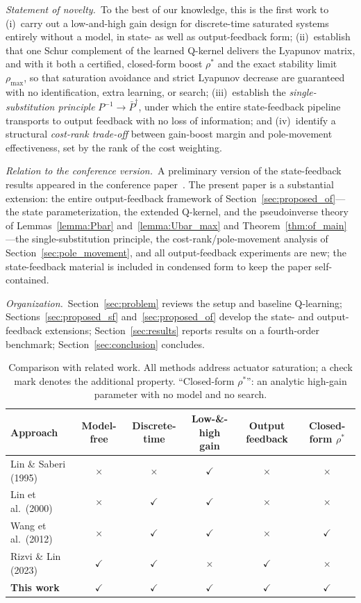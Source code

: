 \documentclass[final,5p,times,authoryear]{elsarticle}
\theoremstyle{plain}
\theoremstyle{definition}
\theoremstyle{remark}
\begin{document}
\emph{Statement of novelty.}\ To the best of our knowledge, this is
the first work to (i)~carry out a low-and-high gain design for
discrete-time saturated systems entirely without a model, in state- as
well as output-feedback form; (ii)~establish that one Schur complement
of the learned Q-kernel delivers the Lyapunov matrix, and with it both
a certified, closed-form boost $\rho^{*}$ and the exact stability
limit $\rho_{\max}$, so that saturation avoidance and strict Lyapunov
decrease are guaranteed with no identification, extra learning, or
search; (iii)~establish the \emph{single-substitution
principle} $P^{-1}\!\to\!\bar P^{\dagger}$, under which the entire
state-feedback pipeline transports to output feedback with no loss of
information; and (iv)~identify a structural \emph{cost-rank trade-off}
between gain-boost margin and pole-movement effectiveness, set by the
rank of the cost weighting.

\emph{Relation to the conference version.}\ A preliminary version of
the state-feedback results appeared in the conference
paper~\citep{DonyRizviLin2026CDC}.  The present paper is a substantial
extension: the entire output-feedback framework of
Section~\ref{sec:proposed_of}---the state parameterization, the
extended Q-kernel, and the pseudoinverse theory of
Lemmas~\ref{lemma:Pbar} and~\ref{lemma:Ubar_max} and
Theorem~\ref{thm:of_main}---the single-substitution principle, the
cost-rank/pole-movement analysis of
Section~\ref{sec:pole_movement}, and all output-feedback experiments
are new; the state-feedback material is included in condensed form to
keep the paper self-contained.

\emph{Organization.}\ Section~\ref{sec:problem} reviews the setup and
baseline Q-learning; Sections~\ref{sec:proposed_sf}
and~\ref{sec:proposed_of} develop the state- and output-feedback
extensions; Section~\ref{sec:results} reports results on a fourth-order
benchmark; Section~\ref{sec:conclusion} concludes.

\begin{table}[t]
\centering
\caption{Comparison with related work.  All methods address actuator
saturation; a check mark denotes the additional property.
``Closed-form $\rho^{*}$'': an analytic high-gain parameter with no
model and no search.}
\label{tab:related_work}
\small
\begin{tabular}{lccccc}
\toprule
Approach & Model-free & Discrete-time & Low-\&-high gain & Output feedback & Closed-form $\rho^{*}$\\
\midrule
Lin \& Saberi (1995)  & $\times$ & $\times$ & $\checkmark$ & $\times$ & $\times$\\
Lin et al.\ (2000)    & $\times$ & $\checkmark$ & $\checkmark$ & $\times$ & $\times$\\
Wang et al.\ (2012)   & $\times$ & $\checkmark$ & $\checkmark$ & $\times$ & $\checkmark$\\
Rizvi \& Lin (2023)   & $\checkmark$ & $\checkmark$ & $\times$ & $\checkmark$ & $\times$\\
\textbf{This work}    & $\checkmark$ & $\checkmark$ & $\checkmark$ & $\checkmark$ & $\checkmark$\\
\bottomrule
\end{tabular}
\end{table}
\end{document}
